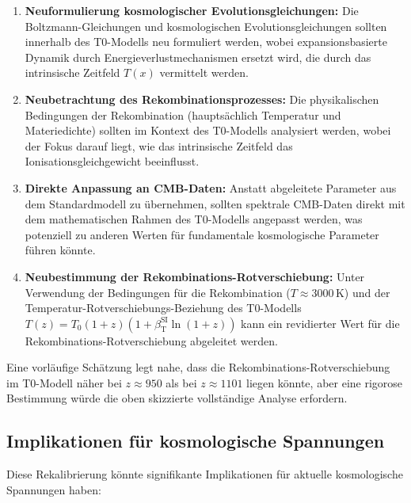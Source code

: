 \documentclass[12pt,a4paper]{article}
\newcommand{\Tfield}{T(x)}
\newcommand{\betaT}{\beta_{\text{T}}}
\begin{document}
	\begin{enumerate}
		\item \textbf{Neuformulierung kosmologischer Evolutionsgleichungen:} Die Boltzmann-Gleichungen und kosmologischen Evolutionsgleichungen sollten innerhalb des T0-Modells neu formuliert werden, wobei expansionsbasierte Dynamik durch Energieverlustmechanismen ersetzt wird, die durch das intrinsische Zeitfeld $\Tfield$ vermittelt werden.
		
		\item \textbf{Neubetrachtung des Rekombinationsprozesses:} Die physikalischen Bedingungen der Rekombination (hauptsächlich Temperatur und Materiedichte) sollten im Kontext des T0-Modells analysiert werden, wobei der Fokus darauf liegt, wie das intrinsische Zeitfeld das Ionisationsgleichgewicht beeinflusst.
		
		\item \textbf{Direkte Anpassung an CMB-Daten:} Anstatt abgeleitete Parameter aus dem Standardmodell zu übernehmen, sollten spektrale CMB-Daten direkt mit dem mathematischen Rahmen des T0-Modells angepasst werden, was potenziell zu anderen Werten für fundamentale kosmologische Parameter führen könnte.
		
		\item \textbf{Neubestimmung der Rekombinations-Rotverschiebung:} Unter Verwendung der Bedingungen für die Rekombination ($T \approx 3000 \, \text{K}$) und der Temperatur-Rotverschiebungs-Beziehung des T0-Modells $T(z) = T_0 (1+z)(1+\betaT^{\text{SI}} \ln(1+z))$ kann ein revidierter Wert für die Rekombinations-Rotverschiebung abgeleitet werden.
	\end{enumerate}
	
	Eine vorläufige Schätzung legt nahe, dass die Rekombinations-Rotverschiebung im T0-Modell näher bei $z \approx 950$ als bei $z \approx 1101$ liegen könnte, aber eine rigorose Bestimmung würde die oben skizzierte vollständige Analyse erfordern.
	
	\subsection{Implikationen für kosmologische Spannungen}
	\label{subsec:cosmological_tensions}
	
	Diese Rekalibrierung könnte signifikante Implikationen für aktuelle kosmologische Spannungen haben:
	
\end{document}
